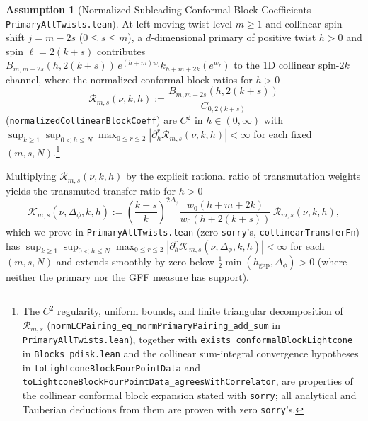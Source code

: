 \documentclass[10pt,a4paper]{article}
\theoremstyle{definition}
\newtheorem{assumption}{Assumption}
\begin{document}
\begin{assumption}[Normalized Subleading Conformal Block Coefficients --- \texttt{PrimaryAllTwists.lean}]
\label{assump:collinear-transfer}
At left-moving twist level $m \ge 1$ and collinear spin shift $j = m - 2s$ ($0 \le s \le m$), a $d$-dimensional primary of positive twist $h > 0$ and spin $\ell = 2(k + s)$ contributes $B_{m, m - 2s}(h, 2(k + s)) \, e^{(h + m)w_l} k_{h + m + 2k}(e^{w_r})$ to the 1D collinear spin-$2k$ channel, where the normalized conformal block ratios for $h > 0$
\begin{equation}
  \label{eq:normalized-block-coeffs}
  \mathcal{R}_{m, s}(\nu, k, h) := \frac{B_{m, m - 2s}(h, 2(k + s))}{C_{0, 2(k + s)}}
\end{equation}
(\texttt{normalizedCollinearBlockCoeff}) are $C^2$ in $h \in (0, \infty)$ with $\sup_{k \ge 1} \sup_{0 < h \le N} \max_{0 \le r \le 2} |\partial_h^r \mathcal{R}_{m, s}(\nu, k, h)| < \infty$ for each fixed $(m, s, N)$.\footnote{The $C^2$ regularity, uniform bounds, and finite triangular decomposition of $\mathcal{R}_{m, s}$ (\texttt{normLCPairing\_eq\_\allowbreak normPrimaryPairing\_add\_sum} in \texttt{PrimaryAllTwists.lean}), together with \texttt{exists\_conformalBlockLightcone} in \texttt{Blocks\_pdisk.lean} and the collinear sum-integral convergence hypotheses in \texttt{toLightconeBlockFourPointData} and \texttt{toLightconeBlockFourPointData\_agreesWithCorrelator}, are properties of the collinear conformal block expansion stated with \texttt{sorry}; all analytical and Tauberian deductions from them are proven with zero \texttt{sorry}'s.}
\end{assumption}
Multiplying $\mathcal{R}_{m, s}(\nu, k, h)$ by the explicit rational ratio of transmutation weights yields the transmuted transfer ratio for $h > 0$
\begin{equation}
  \label{eq:transfer-kernel}
  \mathcal{K}_{m, s}(\nu, \Delta_\phi, k, h) := \left(\frac{k + s}{k}\right)^{2\Delta_\phi} \frac{w_0(h + m + 2k)}{w_0(h + 2(k + s))} \, \mathcal{R}_{m, s}(\nu, k, h),
\end{equation}
which we prove in \texttt{PrimaryAllTwists.lean} (zero \texttt{sorry}'s, \texttt{collinearTransferFn}) has $\sup_{k \ge 1} \sup_{0 < h \le N} \max_{0 \le r \le 2} |\partial_h^r \mathcal{K}_{m, s}(\nu, \Delta_\phi, k, h)| < \infty$ for each $(m, s, N)$ and extends smoothly by zero below $\frac{1}{2}\min(h_{\mathrm{gap}}, \Delta_\phi) > 0$ (where neither the primary nor the GFF measure has support).
\end{document}
